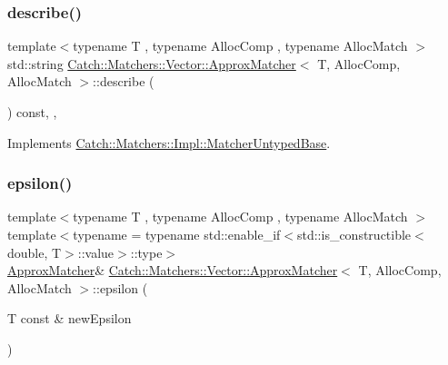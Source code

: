 \subsubsection{\texorpdfstring{describe()}{describe()}}
{\footnotesize\ttfamily template$<$typename T , typename Alloc\+Comp , typename Alloc\+Match $>$ \\
std\+::string \mbox{\hyperlink{struct_catch_1_1_matchers_1_1_vector_1_1_approx_matcher}{Catch\+::\+Matchers\+::\+Vector\+::\+Approx\+Matcher}}$<$ T, Alloc\+Comp, Alloc\+Match $>$\+::describe (\begin{DoxyParamCaption}{ }\end{DoxyParamCaption}) const\hspace{0.3cm}{\ttfamily [inline]}, {\ttfamily [override]}, {\ttfamily [virtual]}}



Implements \mbox{\hyperlink{class_catch_1_1_matchers_1_1_impl_1_1_matcher_untyped_base_a91d3a907dbfcbb596077df24f6e11fe2}{Catch\+::\+Matchers\+::\+Impl\+::\+Matcher\+Untyped\+Base}}.

\mbox{\label{struct_catch_1_1_matchers_1_1_vector_1_1_approx_matcher_a31c47dac5f7346b526a145da343f9e3e}} 
\subsubsection{\texorpdfstring{epsilon()}{epsilon()}}
{\footnotesize\ttfamily template$<$typename T , typename Alloc\+Comp , typename Alloc\+Match $>$ \\
template$<$typename  = typename std\+::enable\+\_\+if$<$std\+::is\+\_\+constructible$<$double, T$>$\+::value$>$\+::type$>$ \\
\mbox{\hyperlink{struct_catch_1_1_matchers_1_1_vector_1_1_approx_matcher}{Approx\+Matcher}}\& \mbox{\hyperlink{struct_catch_1_1_matchers_1_1_vector_1_1_approx_matcher}{Catch\+::\+Matchers\+::\+Vector\+::\+Approx\+Matcher}}$<$ T, Alloc\+Comp, Alloc\+Match $>$\+::epsilon (\begin{DoxyParamCaption}\item[{T const \&}]{new\+Epsilon }\end{DoxyParamCaption})\hspace{0.3cm}{\ttfamily [inline]}}

